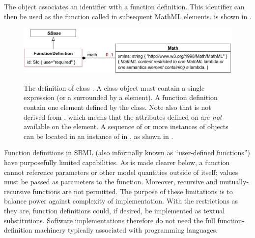 The \FunctionDefinition object associates an identifier with a
function definition.  This identifier can then be used as the
function called in subsequent MathML  elements.
\FunctionDefinition is shown in .

\begin{figure}[htb]
  \centering
  \small
  \vspace*{-0.75ex}
             {\includegraphics[scale=0.78]{figs/functiondefinition-uml}}
  \vspace*{-1ex}
  \caption{The definition of class \FunctionDefinition.  A
     class object must contain a single \mathml
     expression (or a  surrounded by a
     element).  A function definition 
    contain  one  element defined by the
     class.  Note also that  is not
    derived from \SBaseUpright, which means that the attributes defined
    on \SBaseUpright are \emph{not} available on the 
    element.  A sequence of  or more instances of
    \FunctionDefinition objects can be located in an instance of
    \ListOfFunctionDefinitions in \Model, as shown in
    \protect{}.}
  \label{fig:mathdefinition}
  \label{fig:functionDefinition}
\end{figure}

Function definitions in SBML (also informally known as
``user-defined functions'') have purposefully limited capabilities.
As is made clearer below, a function cannot reference
parameters or other model quantities outside of itself; values
must be passed as parameters to the function.  Moreover, recursive
and mutually-recursive functions are not permitted.  The purpose
of these limitations is to balance power against complexity of
implementation.  With the restrictions as they are, function
definitions could, if desired, be implemented as textual substitutions.
Software implementations therefore do not need
the full function-definition machinery typically associated with
programming languages.


